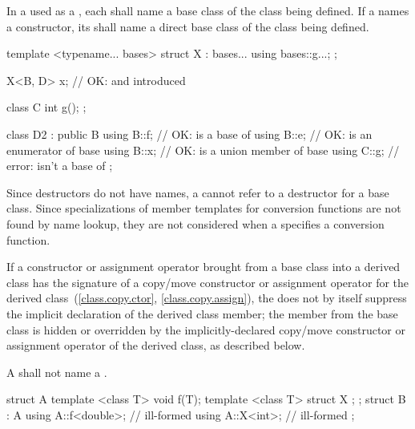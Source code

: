 \pnum
In a  used as a
,
each  
shall name a base class of the class being defined. If a
 names a constructor, its
 shall name a direct base class of the class
being defined.
\begin{example}
\begin{codeblock}
template <typename... bases>
struct X : bases... {
  using bases::g...;
};

X<B, D> x;                      // OK:  and  introduced
\end{codeblock}
\end{example}
\begin{example}
\begin{codeblock}
class C {
  int g();
};

class D2 : public B {
  using B::f;                   // OK:  is a base of 
  using B::e;                   // OK:  is an enumerator of base 
  using B::x;                   // OK:  is a union member of base 
  using C::g;                   // error:  isn't a base of 
};
\end{codeblock}
\end{example}

\pnum
\begin{note}
Since destructors do not have names, a
 cannot refer to a
destructor for a base class. Since specializations of member templates
for conversion functions are not found by name lookup, they are not
considered when a  specifies a conversion
function.
\end{note}
If a constructor or assignment operator brought from a base class into a derived class
has the signature of a copy/move constructor or assignment operator
for the derived class~(\ref{class.copy.ctor}, \ref{class.copy.assign}),
the  does not by itself
suppress the implicit declaration of the derived class member;
the member from the base class is hidden or overridden
by the implicitly-declared copy/move constructor or assignment operator
of the derived class, as described below.

\pnum
A  shall not name a .
\begin{example}

\begin{codeblock}
struct A {
  template <class T> void f(T);
  template <class T> struct X { };
};
struct B : A {
  using A::f<double>;           // ill-formed
  using A::X<int>;              // ill-formed
};
\end{codeblock}
\end{example}

